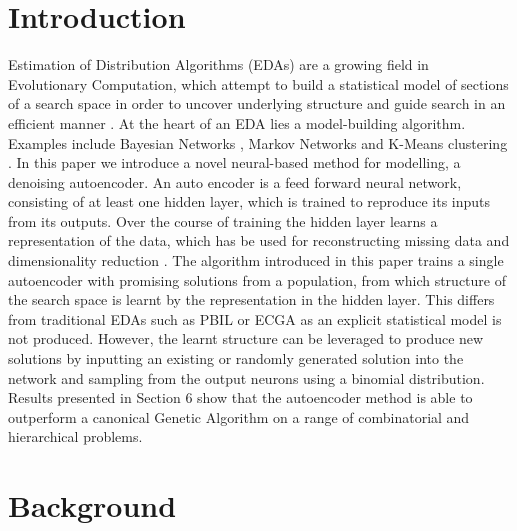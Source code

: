 \documentclass[runningheads,a4paper]{llncs}
\begin{document}
\section{Introduction}

Estimation of Distribution Algorithms (EDAs) are a growing field in Evolutionary Computation, which attempt to build a statistical model of sections of a search space in order to uncover underlying structure and guide search in an efficient manner \cite{pelikan2006scalable}. At the heart of an EDA lies a model-building algorithm. Examples include Bayesian Networks \cite{hboa}, Markov Networks \cite{ref} and K-Means clustering \cite{ref}. In this paper we introduce a novel neural-based method for modelling, a denoising autoencoder. An auto encoder is a feed forward neural network, consisting of at least one hidden layer, which is trained to reproduce its inputs from its outputs. Over the course of training the hidden layer learns a representation of the data, which has be used for reconstructing missing data \cite{ref} and dimensionality reduction \cite{ref}. The algorithm introduced in this paper trains a single autoencoder with promising solutions from a population, from which structure of the search space is learnt by the representation in the hidden layer. This differs from traditional EDAs such as PBIL \cite{ref } or ECGA \cite{ref} as an explicit statistical model is not produced. However, the learnt structure can be leveraged to produce new solutions by inputting an existing or randomly generated solution into the network and sampling from the output neurons using a binomial distribution. Results presented in Section 6 show that the autoencoder method is able to outperform a canonical Genetic Algorithm on a range of combinatorial and hierarchical problems.

\section{Background}
\end{document}
